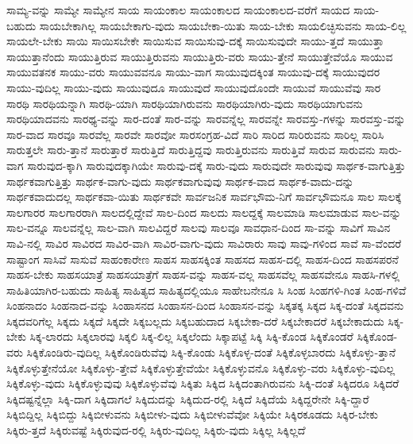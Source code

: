 {ಸಾಮ್ಯ-ವನ್ನು
ಸಾಮ್ಯೇ
ಸಾಮ್ಯೇನ
ಸಾಯ
ಸಾಯಂಕಾಲ
ಸಾಯಂಕಾಲದ
ಸಾಯಂಕಾಲದ-ವರೆಗೆ
ಸಾಯದ
ಸಾಯ-ಬಹುದು
ಸಾಯಬೇಕಾಗಿಲ್ಲ
ಸಾಯಬೇಕಾಗು-ವುದು
ಸಾಯಬೇಕಾ-ಯಿತು
ಸಾಯ-ಬೇಕು
ಸಾಯಲಿಚ್ಛಿಸುವನು
ಸಾಯ-ಲಿಲ್ಲ
ಸಾಯಲೇ-ಬೇಕು
ಸಾಯಿ
ಸಾಯಿಸಬೇಕೇ
ಸಾಯಿಸುವ
ಸಾಯಿಸುವು-ದಕ್ಕೆ
ಸಾಯಿಸುವುದೇ
ಸಾಯು-ತ್ತದೆ
ಸಾಯುತ್ತಾ
ಸಾಯುತ್ತಾನೆಂದು
ಸಾಯುತ್ತಿರುವ
ಸಾಯುತ್ತಿರುವನು
ಸಾಯುತ್ತಿರು-ವರು
ಸಾಯು-ತ್ತೇನೆ
ಸಾಯುತ್ತೇವೆಯೊ
ಸಾಯುವ
ಸಾಯುವತನಕ
ಸಾಯು-ವರು
ಸಾಯುವವನೂ
ಸಾಯು-ವಾಗ
ಸಾಯುವುದಕ್ಕಿಂತ
ಸಾಯುವು-ದಕ್ಕೆ
ಸಾಯುವುದರ
ಸಾಯು-ವುದಿಲ್ಲ
ಸಾಯು-ವುದು
ಸಾಯುವುದೂ
ಸಾಯುವುದೆ
ಸಾಯುವುದೊಂದೇ
ಸಾಯುವೆ
ಸಾಯುವೆವು
ಸಾರ
ಸಾರಥಿ
ಸಾರಥಿಯನ್ನಾಗಿ
ಸಾರಥಿ-ಯಾಗಿ
ಸಾರಥಿಯಾಗಿರುವನು
ಸಾರಥಿಯಾಗಿರು-ವುದು
ಸಾರಥಿಯಾಗುವನು
ಸಾರಥಿಯಾದವನು
ಸಾರಥ್ಯ-ವನ್ನು
ಸಾರ-ದಂತೆ
ಸಾರ-ವನ್ನು
ಸಾರವನ್ನೆಲ್ಲ
ಸಾರವನ್ನೇ
ಸಾರವಸ್ತು-ಗಳನ್ನು
ಸಾರವಸ್ತು-ವನ್ನು
ಸಾರ-ವಾದ
ಸಾರವೂ
ಸಾರವೆಲ್ಲ
ಸಾರವೇ
ಸಾರವೋ
ಸಾರಸಂಗ್ರಹ-ವಿದೆ
ಸಾರಿ
ಸಾರಿದ
ಸಾರಿರುವನು
ಸಾರಿಲ್ಲ
ಸಾರಿಸಿ
ಸಾರುತ್ತಲೇ
ಸಾರು-ತ್ತಾನೆ
ಸಾರುತ್ತಾರೆ
ಸಾರುತ್ತಿದೆ
ಸಾರುತ್ತಿದ್ದವು
ಸಾರುತ್ತಿರುವನು
ಸಾರುತ್ತಿವೆ
ಸಾರುವ
ಸಾರುವನು
ಸಾರು-ವಾಗ
ಸಾರುವುದ-ಕ್ಕಾಗಿ
ಸಾರುವುದಕ್ಕಾಗಿಯೇ
ಸಾರುವು-ದಕ್ಕೆ
ಸಾರು-ವುದು
ಸಾರುವುದೇ
ಸಾರುವುವು
ಸಾರ್ಥಕ-ವಾಗುತ್ತಿತ್ತು
ಸಾರ್ಥಕವಾಗುತ್ತಿತ್ತು
ಸಾರ್ಥಕ-ವಾಗು-ವುದು
ಸಾರ್ಥಕವಾಗುವುವು
ಸಾರ್ಥಕ-ವಾದ
ಸಾರ್ಥಕ-ವಾದು-ದನ್ನು
ಸಾರ್ಥಕವಾದುದಲ್ಲ
ಸಾರ್ಥಕವಾ-ಯಿತು
ಸಾರ್ಥಕವೇ
ಸಾರ್ವಜನಿಕ
ಸಾರ್ವಭೌಮ-ನಿಗೆ
ಸಾರ್ವಭೌಮನೂ
ಸಾಲ
ಸಾಲಕ್ಕೆ
ಸಾಲಗಾರರ
ಸಾಲಗಾರರಾಗಿ
ಸಾಲದಲ್ಲಿದ್ದೇವೆ
ಸಾಲ-ದಿಂದ
ಸಾಲದು
ಸಾಲದ್ದಕ್ಕೆ
ಸಾಲಮಾಡಿ
ಸಾಲಮಾಡುವ
ಸಾಲ-ವನ್ನು
ಸಾಲ-ವನ್ನೂ
ಸಾಲವನ್ನೆಲ್ಲ
ಸಾಲ-ವಾಗಿ
ಸಾಲವಿದ್ದರೆ
ಸಾಲವು
ಸಾಲವೂ
ಸಾವಧಾನ-ದಿಂದ
ಸಾ-ವನ್ನು
ಸಾವಿಗೆ
ಸಾವಿನ
ಸಾವಿ-ನಲ್ಲಿ
ಸಾವಿರ
ಸಾವಿರದ
ಸಾವಿರ-ವಾಗಿ
ಸಾವಿರ-ವಾಗು-ವುದು
ಸಾವಿರಾರು
ಸಾವು
ಸಾವು-ಗಳಿಂದ
ಸಾವೆ
ಸಾ-ವೆಂದರೆ
ಸಾಷ್ಟಾಂಗ
ಸಾಸಿವೆ
ಸಾಸುವೆ
ಸಾಹಂಕಾರೇಣ
ಸಾಹಸ
ಸಾಹಸಕ್ಕಿಂತ
ಸಾಹಸದ
ಸಾಹಸ-ದಲ್ಲಿ
ಸಾಹಸ-ದಿಂದ
ಸಾಹಸಪರನೆ
ಸಾಹಸ-ಬೇಕು
ಸಾಹಸಯಾತ್ರೆ
ಸಾಹಸಯಾತ್ರೆಗೆ
ಸಾಹಸ-ವನ್ನು
ಸಾಹಸ-ವಲ್ಲ
ಸಾಹಸವೆಲ್ಲ
ಸಾಹಸವೇನೂ
ಸಾಹಸಿ-ಗಳಲ್ಲಿ
ಸಾಹಿತಿಯಾಗಿರ-ಬಹುದು
ಸಾಹಿತ್ಯ
ಸಾಹಿತ್ಯದ
ಸಾಹಿತ್ಯದಲ್ಲಿಯೂ
ಸಾಹೇಬನೇನೂ
ಸಿ
ಸಿಂಹ
ಸಿಂಹಗಳಿ-ಗಿಂತ
ಸಿಂಹ-ಗಳಿವೆ
ಸಿಂಹನಾದಂ
ಸಿಂಹನಾದ-ವನ್ನು
ಸಿಂಹಾಸನದ
ಸಿಂಹಾಸನ-ದಿಂದ
ಸಿಂಹಾಸನ-ವನ್ನು
ಸಿಕ್ಕತಕ್ಕ
ಸಿಕ್ಕದ
ಸಿಕ್ಕ-ದಂತೆ
ಸಿಕ್ಕದವನು
ಸಿಕ್ಕದವರಿಗೆಲ್ಲ
ಸಿಕ್ಕದು
ಸಿಕ್ಕದೆ
ಸಿಕ್ಕದೇ
ಸಿಕ್ಕಬಲ್ಲದು
ಸಿಕ್ಕಬಹುದಾದ
ಸಿಕ್ಕಬೇಕಾ-ದರೆ
ಸಿಕ್ಕಬೇಕಾದರೆ
ಸಿಕ್ಕಬೇಕಾದುದು
ಸಿಕ್ಕ-ಬೇಕು
ಸಿಕ್ಕ-ಲಾರದು
ಸಿಕ್ಕಲಾರವು
ಸಿಕ್ಕಲಿ
ಸಿಕ್ಕ-ಲಿಲ್ಲ
ಸಿಕ್ಕಲೆಂದು
ಸಿಕ್ಕಾಪಟ್ಟೆ
ಸಿಕ್ಕಿ
ಸಿಕ್ಕಿ-ಕೊಂಡ
ಸಿಕ್ಕಿಕೊಂಡರೆ
ಸಿಕ್ಕಿಕೊಂಡ-ವರು
ಸಿಕ್ಕಿಕೊಂಡಿರು-ವುದಿಲ್ಲ
ಸಿಕ್ಕಿಕೊಂಡಿರುವೆವು
ಸಿಕ್ಕಿ-ಕೊಂಡು
ಸಿಕ್ಕಿಕೊಳ್ಳ-ದಂತೆ
ಸಿಕ್ಕಿಕೊಳ್ಳಬಾರದು
ಸಿಕ್ಕಿಕೊಳ್ಳು-ತ್ತಾನೆ
ಸಿಕ್ಕಿಕೊಳ್ಳುತ್ತೇನೆಯೋ
ಸಿಕ್ಕಿಕೊಳ್ಳು-ತ್ತೇವೆ
ಸಿಕ್ಕಿಕೊಳ್ಳುತ್ತೇವೆಯೇ
ಸಿಕ್ಕಿಕೊಳ್ಳುವನೊ
ಸಿಕ್ಕಿಕೊಳ್ಳು-ವರು
ಸಿಕ್ಕಿಕೊಳ್ಳು-ವುದಿಲ್ಲ
ಸಿಕ್ಕಿಕೊಳ್ಳು-ವುದು
ಸಿಕ್ಕಿಕೊಳ್ಳುವುವು
ಸಿಕ್ಕಿಕೊಳ್ಳುವೆವು
ಸಿಕ್ಕಿತು
ಸಿಕ್ಕಿದ
ಸಿಕ್ಕಿದಂತಾಗಿರುವನು
ಸಿಕ್ಕಿ-ದಂತೆ
ಸಿಕ್ಕಿದರೂ
ಸಿಕ್ಕಿದರೆ
ಸಿಕ್ಕಿದಷ್ಟನ್ನೆಲ್ಲಾ
ಸಿಕ್ಕಿ-ದಾಗ
ಸಿಕ್ಕಿದಾಗಲೆ
ಸಿಕ್ಕಿದುದನ್ನು
ಸಿಕ್ಕಿದುದ-ರಲ್ಲಿ
ಸಿಕ್ಕಿದೆ
ಸಿಕ್ಕಿದೆಯೆ
ಸಿಕ್ಕಿದ್ದರೇನೇ
ಸಿಕ್ಕಿ-ದ್ದಾರೆ
ಸಿಕ್ಕಿಬಿದ್ದಿಲ್ಲ
ಸಿಕ್ಕಿಬಿದ್ದು
ಸಿಕ್ಕಿಬೀಳುವನು
ಸಿಕ್ಕಿಬೀಳು-ವುದು
ಸಿಕ್ಕಿಬೀಳುವೆವೋ
ಸಿಕ್ಕಿಯೇ
ಸಿಕ್ಕಿರಕೂಡದು
ಸಿಕ್ಕಿರ-ಬೇಕು
ಸಿಕ್ಕಿರು-ತ್ತದೆ
ಸಿಕ್ಕಿರುವಷ್ಟೆ
ಸಿಕ್ಕಿರುವುದ-ರಲ್ಲಿ
ಸಿಕ್ಕಿರು-ವುದಿಲ್ಲ
ಸಿಕ್ಕಿರು-ವುದು
ಸಿಕ್ಕಿಲ್ಲ
ಸಿಕ್ಕಿಲ್ಲದೆ
}

